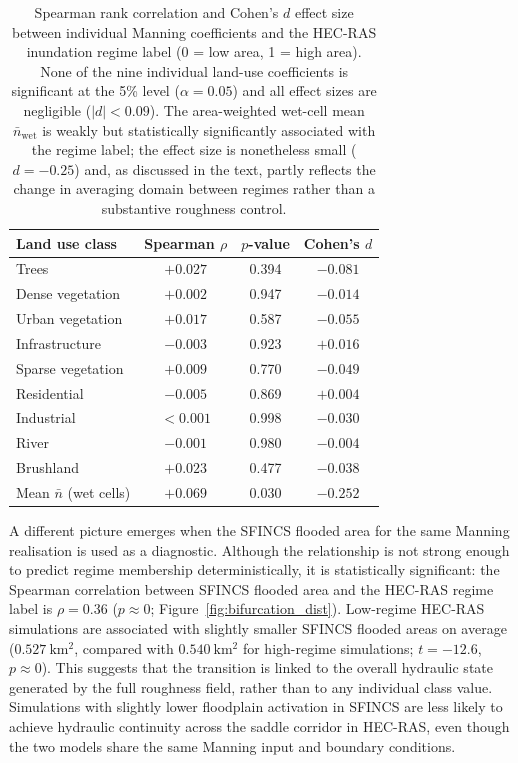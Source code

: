 \documentclass[a4paper,fleqn]{cas-sc}
\newcommand{\sfincs}{\textsc{SFINCS}}
\newcommand{\hecras}{\textsc{HEC-RAS}}
\begin{document}
\begin{table}[htbp]
\centering
\caption{Spearman rank correlation and Cohen's $d$ effect size between individual
Manning coefficients and the \hecras{} inundation regime label (0 = low area,
1 = high area). None of the nine individual land-use coefficients is
significant at the 5\% level ($\alpha = 0.05$) and all effect sizes are
negligible ($|d|<0.09$). The area-weighted wet-cell mean $\bar{n}_{\mathrm{wet}}$
is weakly but statistically significantly associated with the regime label;
the effect size is nonetheless small ($d=-0.25$) and, as discussed in the text,
partly reflects the change in averaging domain between regimes rather than a
substantive roughness control.}
\label{tab:regime_manning}
\small
\begin{tabular}{lccc}
\toprule
Land use class & Spearman $\rho$ & $p$-value & Cohen's $d$ \\
\midrule
Trees             & $+0.027$ & 0.394 & $-0.081$ \\
Dense vegetation  & $+0.002$ & 0.947 & $-0.014$ \\
Urban vegetation  & $+0.017$ & 0.587 & $-0.055$ \\
Infrastructure    & $-0.003$ & 0.923 & $+0.016$ \\
Sparse vegetation & $+0.009$ & 0.770 & $-0.049$ \\
Residential       & $-0.005$ & 0.869 & $+0.004$ \\
Industrial        & $<0.001$ & 0.998 & $-0.030$ \\
River             & $-0.001$ & 0.980 & $-0.004$ \\
Brushland         & $+0.023$ & 0.477 & $-0.038$ \\
Mean $\bar{n}$ (wet cells) & $+0.069$ & 0.030 & $-0.252$ \\
\bottomrule
\end{tabular}
\end{table}


A different picture emerges when the \sfincs{} flooded area for the same Manning realisation is used as a diagnostic. Although the relationship is not strong enough to predict regime membership deterministically, it is statistically significant: the Spearman correlation between \sfincs{} flooded area and the \hecras{} regime label is $\rho=0.36$ ($p\approx 0$; Figure~\ref{fig:bifurcation_dist}). Low-regime \hecras{} simulations are associated with slightly smaller \sfincs{} flooded areas on average ($0.527~\mathrm{km^2}$, compared with $0.540~\mathrm{km^2}$ for high-regime simulations; $t=-12.6$, $p\approx 0$). This suggests that the transition is linked to the overall hydraulic state generated by the full roughness field, rather than to any individual class value. Simulations with slightly lower floodplain activation in \sfincs{} are less likely to achieve hydraulic continuity across the saddle corridor in \hecras{}, even though the two models share the same Manning input and boundary conditions.
\end{document}
